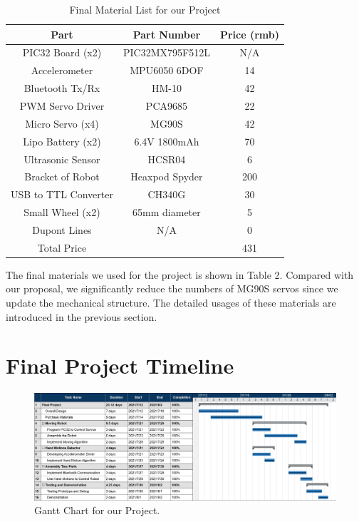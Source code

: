 \documentclass[a4paper]{article}
\begin{document}
\begin{table}[htbp]
    \centering
    \begin{tabular}{ccc}    
        \toprule    
            Part & Part Number & Price (rmb) \\    
        \midrule
            PIC32 Board   (x2)     & PIC32MX795F512L      & N/A    \\
            Accelerometer          & MPU6050 6DOF         & 14     \\
            Bluetooth   Tx/Rx      & HM-10                & 42     \\
            PWM Servo Driver       & PCA9685              & 22    \\
            Micro Servo (x4)       & MG90S                & 42    \\
            Lipo Battery (x2)      & 6.4V 1800mAh         & 70     \\
            Ultrasonic Sensor      & HCSR04               & 6      \\
            Bracket of Robot       & Heaxpod Spyder       & 200    \\
            USB to TTL Converter   & CH340G               & 30     \\
            Small Wheel (x2)       & 65mm diameter        & 5      \\
            Dupont Lines           & N/A                  & 0      \\
        \bottomrule
            Total Price  &  & 431  \\  
    \end{tabular}
    \caption{Final Material List for our Project}  
\end{table}

The final materials we used for the project is shown in Table 2. Compared with our proposal, we significantly reduce the numbers of MG90S servos since we update the mechanical structure. The detailed usages of these materials are introduced in the previous section.

\section{Final Project Timeline}
\begin{figure}[H]
    \centering
    \includegraphics[width=1\textwidth]{Final Timeline.jpg}
    \caption{Gantt Chart for our Project.}
\end{figure}
\end{document}
